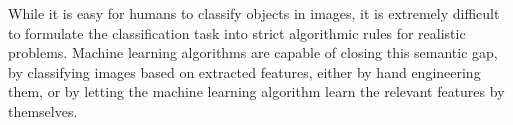 
While it is easy for humans to classify objects in images, it is extremely difficult to formulate the classification task into strict algorithmic rules for realistic problems. Machine learning algorithms are capable of closing this semantic gap, by classifying images based on extracted features, either by hand engineering them, or by letting the machine learning algorithm learn the relevant features by themselves. \\





